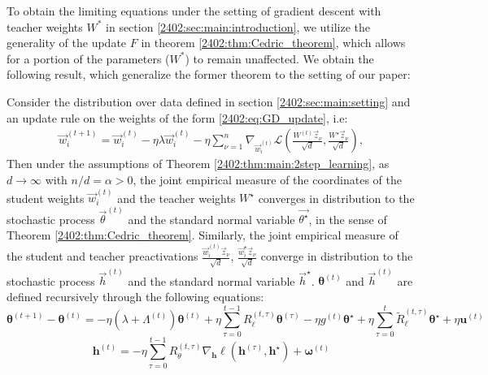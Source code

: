     
To obtain the limiting equations under the setting of gradient descent with teacher weights $W^*$ in section \ref{2402:sec:main:introduction}, we utilize the generality of the update $F$ in theorem \ref{2402:thm:Cedric_theorem}, which allows for a portion of the parameters ($W^*$) to remain unaffected. We obtain the following result, which generalize the former theorem to the setting of our paper:
\begin{theorem}\label{2402:thm:DMFT_committee}
Consider the distribution over data defined in section \ref{2402:sec:main:setting} and an update rule on the weights of the form \eqref{2402:eq:GD_update}, i.e:
    \begin{align} 
    \vec w_i^{(t+1)} = \vec w^{(t)}_i - \eta \lambda \vec w^{(t)}_i - \eta \sum_{\nu=1}^n\nabla_{\vec w^{(t)}_i}  \mathcal{L}\left(\frac{W^{(t)}\vec z_\nu} {\sqrt{d}}, \frac{W^\star\vec z_\nu} {\sqrt{d}} \right) ,
    \end{align}
Then under the assumptions of Theorem \ref{2402:thm:main:2step_learning}, as $d \rightarrow \infty$ with $n/d=\alpha >0$, the joint empirical measure of the coordinates of the student weights $\vec w_i^{(t)}$ and the teacher weights
$W^\star$  converges in distribution to  the stochastic process $\vec{\theta}^{(t)}$ and the standard normal variable $\vec{\theta^\star}$, in the sense of Theorem \ref{2402:thm:Cedric_theorem}. Similarly, the joint empirical measure of the student and teacher preactivations $\frac{\vec w_i^{(t)}\vec z_\nu} {\sqrt{d}}$, $\frac{\vec w_i^\star\vec z_\nu} {\sqrt{d}}$ converge in distribution to the stochastic process
$\vec{h}^{(t)}$ and the standard normal variable $\vec{h}^\star$. $\boldsymbol{\theta}^{(t)}$ and $\vec{h}^{(t)}$ are defined recursively through the following equations:
\begin{equation} \label{2402:eq:def_theta_planted}
    \boldsymbol{\theta}^{(t+1)} -  \boldsymbol{\theta}^{(t)}= -  \eta \left(\lambda + \Lambda^{(t)}\right)\boldsymbol{\theta}^{(t)} + \eta \sum_{\tau=0}^{t-1}  R_\ell^{(t,\tau)}\boldsymbol{\theta}^{(\tau)} -  \eta g^{(t)}\boldsymbol{\theta}^\star +  \eta \sum_{\tau=0}^{t}  \tilde R_\ell^{(t,\tau)}\boldsymbol{\theta}^\star +  \eta \boldsymbol{u}^{(t)}
\end{equation}
\begin{equation} \label{2402:eq:def_h_planted}
    \boldsymbol{h}^{(t)} = -\eta\sum_{\tau=0}^{t-1}R_\theta^{(t,\tau)} \nabla_{\boldsymbol{h}} \ell(\boldsymbol{h}^{(\tau)}, \boldsymbol{h}^\star) + \boldsymbol{\omega}^{(t)}
\end{equation}

\end{theorem}
